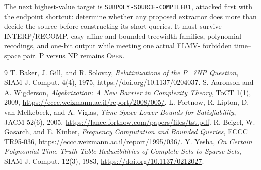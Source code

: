 \documentclass[11pt]{article}
\newcommand{\status}[1]{\textsc{#1}}
\begin{document}
The next highest-value target is \texttt{SUBPOLY-SOURCE-COMPILER1}, attacked
first with the endpoint shortcut: determine whether any proposed extractor
does more than decide the source before constructing its short queries.  It
must survive INTERP/RECOMP, easy affine and bounded-treewidth families,
polynomial recodings, and one-bit output while meeting one actual FLMV-
forbidden time--space pair.  P versus NP remains \status{Open}.

\begin{thebibliography}{9}
 T. Baker, J. Gill, and R. Solovay,
\emph{Relativizations of the P=?NP Question}, SIAM J. Comput. 4(4), 1975,
\url{https://doi.org/10.1137/0204037}.
 S. Aaronson and A. Wigderson,
\emph{Algebrization: A New Barrier in Complexity Theory}, ToCT 1(1), 2009,
\url{https://eccc.weizmann.ac.il/report/2008/005/}.
 L. Fortnow, R. Lipton, D. van Melkebeek, and A. Viglas,
\emph{Time-Space Lower Bounds for Satisfiability}, JACM 52(6), 2005,
\url{https://lance.fortnow.com/papers/files/tst.pdf}.
 R. Beigel, W. Gasarch, and E. Kinber,
\emph{Frequency Computation and Bounded Queries}, ECCC TR95-036,
\url{https://eccc.weizmann.ac.il/report/1995/036/}.
 Y. Yesha,
\emph{On Certain Polynomial-Time Truth-Table Reducibilities of Complete Sets
to Sparse Sets}, SIAM J. Comput. 12(3), 1983,
\url{https://doi.org/10.1137/0212027}.
\end{thebibliography}

\end{document}

